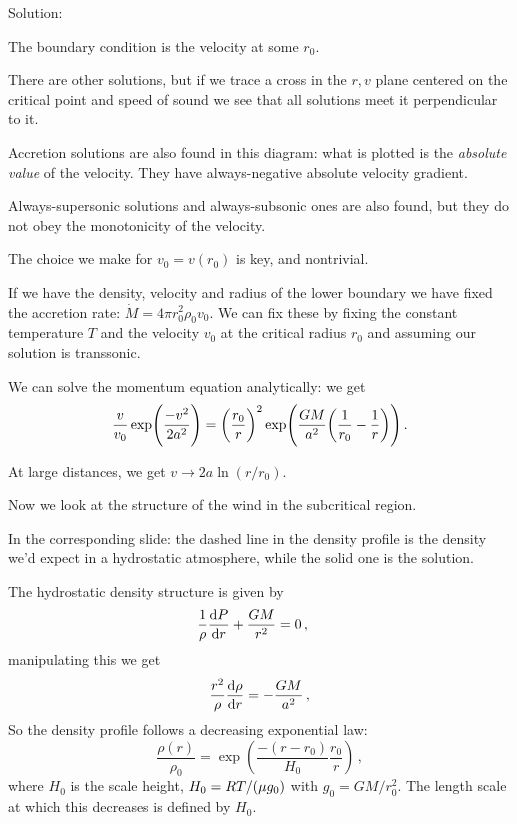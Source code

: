 \documentclass[main.tex]{subfiles}
\begin{document}
\begin{bluebox}
Solution: 
\end{bluebox}

The boundary condition is the velocity at some \(r_0 \).

There are other solutions, but if we trace a cross in the \(r, v\) plane centered on the critical point and speed of sound we see that all solutions meet it perpendicular to it.

Accretion solutions are also found in this diagram: what is plotted is the \emph{absolute value} of the velocity. They have always-negative absolute velocity gradient.

Always-supersonic solutions and always-subsonic ones are also found, but they do not obey the monotonicity of the velocity.

The choice we make for \(v_0  = v(r_0)\) is key, and nontrivial.

If we have the density, velocity and radius of the lower boundary we have fixed the accretion rate: \(\dot{M}  = 4 \pi r_0^2 \rho_0 v_0 \).
We can fix these by fixing the constant temperature \(T\) and the velocity \(v_0 \) at the critical radius \(r_0\) and assuming our solution is transsonic.


We can solve the momentum equation analytically: we get 
%
\begin{equation}
  \frac{v}{v_0 } \exp( \frac{-v^2}{2 a^2}) = \qty(\frac{r_0}{r})^2 \exp(\frac{GM}{a^2} \qty(\frac{1}{r_0 } - \frac{1}{r}))  
\,.
\end{equation}
%

At large distances, we get \(v \rightarrow 2 a \ln(r/r_0)\).

Now we look at the structure of the wind in the subcritical region.

In the corresponding slide: the dashed line in the density profile is the density we'd expect in a hydrostatic atmosphere, while the solid one is the solution.

The hydrostatic density structure is given by 
%
\begin{subequations}
\begin{align}
  \frac{1}{\rho } \dv{P}{r}  +\frac{GM }{r^2}  &= 0 
\,,
\end{align}
\end{subequations}
%
manipulating this we get 
%
\begin{equation}
  \frac{r^2}{\rho } \dv{\rho }{r} = - \frac{GM}{a^2}
\,,
\end{equation}
%
So the density profile follows a decreasing exponential law: 
%
\begin{equation}
  \frac{\rho (r)}{\rho_0 } = \exp(\frac{-(r-r_0 )}{H_0 } \frac{r_0}{r} ) 
\,,
\end{equation}
%
where \(H_0 \) is the scale height, \(H_0 = RT / \qty(\mu g_0 )\) with \(g_0 = GM / r_0^2\).
The length scale at which this decreases is defined by \(H_0 \). 
\end{document}
